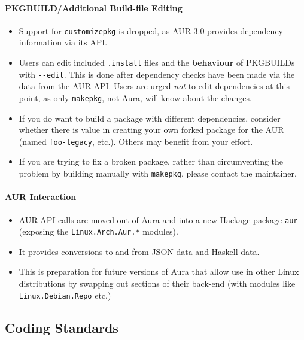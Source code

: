 \documentclass{article}
\begin{document}
\paragraph{PKGBUILD/Additional Build-file
Editing}\label{pkgbuildadditional-build-file-editing}

\begin{itemize}
\itemsep1pt\parskip0pt
\item
  Support for \texttt{customizepkg} is dropped, as AUR 3.0 provides
  dependency information via its API.
\item
  Users can edit included \texttt{.install} files and the
  \textbf{behaviour} of PKGBUILDs with \texttt{-\/-edit}. This is done
  after dependency checks have been made via the data from the AUR API.
  Users are urged \emph{not} to edit dependencies at this point, as only
  \texttt{makepkg}, not Aura, will know about the changes.
\item
  If you do want to build a package with different dependencies,
  consider whether there is value in creating your own forked package
  for the AUR (named \texttt{foo-legacy}, etc.). Others may benefit from
  your effort.
\item
  If you are trying to fix a broken package, rather than circumventing
  the problem by building manually with \texttt{makepkg}, please contact
  the maintainer.
\end{itemize}

\paragraph{AUR Interaction}\label{aur-interaction}

\begin{itemize}
\itemsep1pt\parskip0pt
\item
  AUR API calls are moved out of Aura and into a new Hackage package
  \texttt{aur} (exposing the \texttt{Linux.Arch.Aur.*} modules).
\item
  It provides conversions to and from JSON data and Haskell data.
\item
  This is preparation for future versions of Aura that allow use in
  other Linux distributions by swapping out sections of their back-end
  (with modules like \texttt{Linux.Debian.Repo} etc.)
\end{itemize}

\subsection{Coding Standards}\label{coding-standards}
\end{document}
